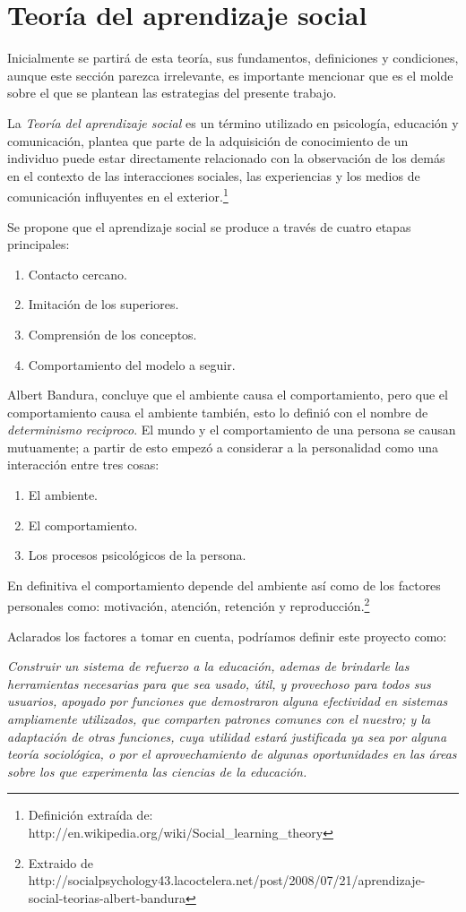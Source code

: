 \section{Teoría del aprendizaje social}
Inicialmente se partirá de esta teoría, sus fundamentos, definiciones y condiciones, aunque este sección parezca irrelevante, es importante mencionar que es el molde sobre el que se plantean las estrategias del presente trabajo.

La \emph{Teoría del aprendizaje social} es un término utilizado en psicología, educación y comunicación, plantea que parte de la adquisición de conocimiento de un individuo puede estar directamente relacionado con la observación de los demás en el contexto de las interacciones sociales, las experiencias y los medios de comunicación influyentes en el exterior.\footnote{Definición extraída de: http://en.wikipedia.org/wiki/Social\_learning\_theory}

Se propone que el aprendizaje social se produce a través de cuatro etapas principales:

\begin{enumerate}
\item Contacto cercano.
\item Imitación de los superiores.
\item Comprensión de los conceptos.
\item Comportamiento del modelo a seguir.
\end{enumerate}

Albert Bandura, concluye que el ambiente causa el comportamiento, pero que el comportamiento causa el ambiente también, esto lo definió con el nombre de \emph{determinismo reciproco}. El mundo y el comportamiento de una persona se causan mutuamente; a partir de esto empezó a considerar a la personalidad como una interacción entre tres cosas:

\begin{enumerate}
\item El ambiente.
\item El comportamiento.
\item Los procesos psicológicos de la persona.
\end{enumerate}

En definitiva el comportamiento depende del ambiente así como de los factores personales como: motivación, atención, retención y reproducción.\footnote{Extraido de http://socialpsychology43.lacoctelera.net/post/2008/07/21/aprendizaje-social-teorias-albert-bandura}

Aclarados los factores a tomar en cuenta, podríamos definir este proyecto como:

\emph{Construir un sistema de refuerzo a la educación, ademas de brindarle las herramientas necesarias para que sea usado, útil, y provechoso para todos sus usuarios, apoyado por funciones que demostraron alguna efectividad en sistemas ampliamente utilizados, que comparten patrones comunes con el nuestro; y la adaptación de otras funciones, cuya utilidad estará justificada ya sea por alguna teoría sociológica, o por el aprovechamiento de algunas oportunidades en las áreas sobre los que experimenta las ciencias de la educación.}
